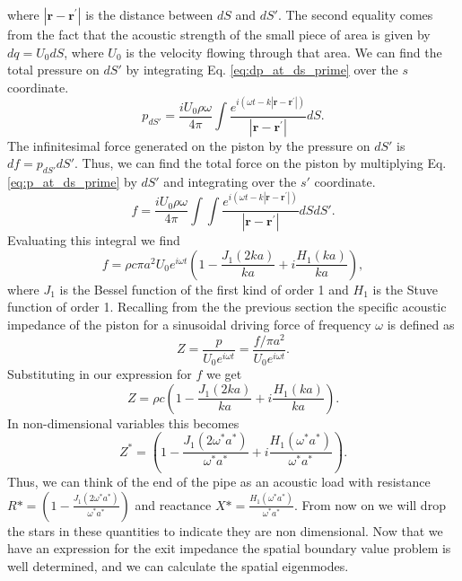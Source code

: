 \documentclass[superscriptaddress, onecolumn, prl]{revtex4}
\begin{document}
where $|\textbf{r}-\textbf{r}^\prime|$ is the distance between $dS$ and $dS'$. The second equality comes from the fact that the acoustic strength of the small piece of area is given by $dq = U_0 dS$, where $U_0$ is the velocity flowing through that area. We can find the total pressure on $dS'$ by integrating Eq. \ref{eq:dp_at_ds_prime} over the $s$ coordinate.
\begin{equation}
\label{eq:p_at_ds_prime}
p_{dS'} = \frac{i U_0 \rho \omega}{4 \pi} \int \frac{e^{i(\omega t-k|\textbf{r}-\textbf{r}^\prime|)}}{|\textbf{r}-\textbf{r}^\prime|} dS.
\end{equation}
The infinitesimal force generated on the piston by the pressure on $dS'$ is $df = p_{dS'} dS'$. Thus, we can find the total force on the piston by multiplying Eq. \ref{eq:p_at_ds_prime} by $dS'$ and integrating over the $s'$ coordinate.
\begin{equation}
f = \frac{i U_0 \rho \omega}{4 \pi} \int \int \frac{e^{i(\omega t-k|\textbf{r}-\textbf{r}^\prime|)}}{|\textbf{r}-\textbf{r}^\prime|} dS dS'.
\end{equation}
Evaluating this integral we find
\begin{equation}
f=\rho c \pi a^2 U_0 e^{i \omega t} \left(1 - \frac{J_1(2ka)}{ka} + i \frac{H_1(ka)}{ka} \right),
\end{equation}
where $J_1$ is the Bessel function of the first kind of order 1 and $H_1$ is the Stuve function of order 1. Recalling from the the previous section the specific acoustic impedance of the piston for a sinusoidal driving force of frequency $\omega$ is defined as 
\begin{equation}
Z = \frac{p}{U_0 e^{i \omega t}} = \frac{f/ \pi a^2 }{U_0 e^{i \omega t}}.
\end{equation}
Substituting in our expression for $f$ we get
\begin{equation}
Z = \rho c \left(1 - \frac{J_1(2ka)}{ka} + i \frac{H_1(ka)}{ka} \right).
\end{equation}
In non-dimensional variables this becomes
\begin{equation}
\label{eq:impedance}
Z^* = \left(1 - \frac{J_1(2\omega^*a^*)}{\omega^*a^*} + i \frac{H_1(\omega^*a^*)}{\omega^*a^*} \right).
\end{equation}
Thus, we can think of the end of the pipe as an acoustic load with resistance $R* = \left(1 - \frac{J_1(2\omega^*a^*)}{\omega^*a^*} \right)$ and reactance $X* = \frac{H_1(\omega^*a^*)}{\omega^*a^*}$. From now on we will drop the stars in these quantities to indicate they are non dimensional. Now that we have an expression for the exit impedance the spatial boundary value problem is well determined, and we can calculate the spatial eigenmodes.
\end{document}
